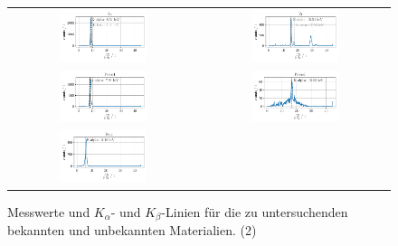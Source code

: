 \documentclass[ngerman]{scrartcl}
\begin{document}
\begin{figure}[H]
    \centering
    \begin{tabular}{cc}
      \includegraphics[width=0.48\textwidth]{../plots/roentgen_data_7.pdf} &
      \includegraphics[width=0.48\textwidth]{../plots/roentgen_data_8.pdf} \\
      \includegraphics[width=0.48\textwidth]{../plots/roentgen_data_9.pdf} &
      \includegraphics[width=0.48\textwidth]{../plots/roentgen_data_10.pdf} \\
      \includegraphics[width=0.48\textwidth]{../plots/roentgen_data_11.pdf} &\\
    \end{tabular}
    \caption{Messwerte und $K_{\alpha}$- und $K_{\beta}$-Linien für die zu untersuchenden bekannten und unbekannten Materialien. (2)}
    \label{fig:roentgenfloureszenz2}
  \end{figure}
\end{document}
